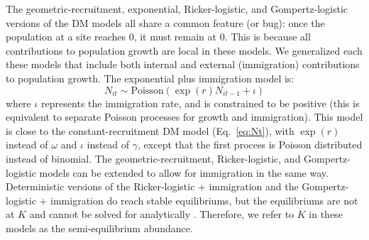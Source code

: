 \documentclass[12pt]{article}
\begin{document}
The geometric-recruitment, exponential, Ricker-logistic, and Gompertz-logistic
versions of the DM models all share a common feature (or bug):
once the population at a site reaches 0, it must remain at 0.
This is because all contributions to population growth are
local in these models.  We generalized each these models that
include both internal and external (immigration) contributions
to population growth.  The exponential plus immigration
model is:
\begin{equation}
  N_{it} \sim \text{Poisson}(\exp(r)N_{it-1} + \iota)
  \label{eq:expimm2}
\end{equation}
where $\iota$ represents the immigration rate, and is
constrained to be
positive (this is equivalent to separate Poisson processes for
growth and immigration).  This model is close to
the constant-recruitment DM model (Eq.~\ref{eq:Nt}), with $\exp(r)$ instead
of $\omega$ and $\iota$ instead of $\gamma$, except that the first
process is Poisson distributed instead of binomial. The geometric-recruitment, Ricker-logistic,
and Gompertz-logistic models can be extended to allow for immigration in the
same way.   Deterministic versions of the Ricker-logistic + immigration and the 
Gompertz-logistic + immigration do reach stable equilibriums, but the equilibriums are not at $K$ and cannot be solved for analytically \citep{otto_day:2007}.  Therefore, we
refer to $K$ in these models as the semi-equilibrium abundance.

\end{document}
